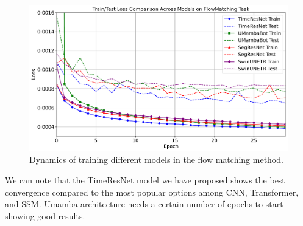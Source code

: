 \documentclass{article}
\begin{document}
\begin{figure}[h!]
    \begin{minipage}[t]{0.65\linewidth}
        \centering
        \includegraphics[width=\linewidth]{images/flow_loss_plot.pdf}
        \caption{Dynamics of training different models in the flow matching method.}
        \label{fig:flow_loss}
    \end{minipage}
\end{figure}

We can note that the TimeResNet model we have proposed shows the best convergence compared to the most popular options among CNN, Transformer, and SSM. Umamba architecture needs a certain number of epochs to start showing good results.

\end{document}
